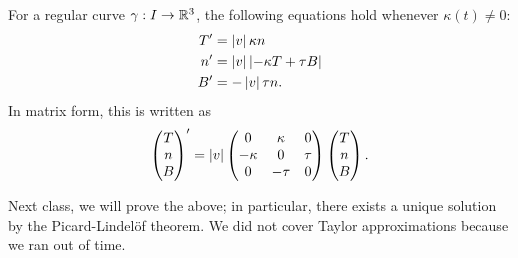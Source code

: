 \begin{simplethm}
    For a regular curve $\gamma : I \to \mathbb R^3$, the following equations hold whenever $\kappa(t) \neq 0$:
    \begin{align*}
        T' &= \left\lvert v \right\rvert \kappa n \\
        n' &= \left\lvert v \right\rvert \left\lvert -\kappa T + \tau B \right\rvert \\
        B' &= - \left\lvert v \right\rvert \tau n.
    \end{align*}
    In matrix form, this is written as
    \[ \begin{pmatrix} T \\ n \\ B \end{pmatrix}' = \left\lvert v \right\rvert \begin{pmatrix} 0 & \kappa & 0 \\ -\kappa & 0 & \tau \\ 0 & -\tau & 0 \end{pmatrix} \begin{pmatrix} T \\ n \\ B \end{pmatrix}. \]
\end{simplethm}
\noindent Next class, we will prove the above; in particular, there exists a unique solution by the Picard-Lindel\"of theorem. We did not cover Taylor approximations because we ran out of time.